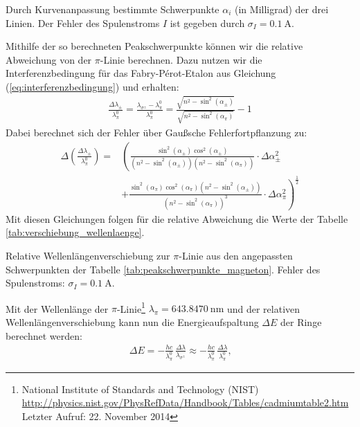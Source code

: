 \documentclass[11pt, a4paper]{article}
\begin{document}
\begin{table}[h]
	\centering
	\resizebox{\columnwidth}{!}{%
		}
	\caption{Durch Kurvenanpassung bestimmte Schwerpunkte $\alpha_i$ (in Milligrad) der drei Linien. Der Fehler des Spulenstroms $I$ ist gegeben durch $\sigma_I = \SI{0.1}{\ampere}$.}
	\label{tab:peakschwerpunkte_magneton}
\end{table}
Mithilfe der so berechneten Peakschwerpunkte können wir die relative Abweichung von der $\pi$-Linie berechnen.
Dazu nutzen wir die Interferenzbedingung für das Fabry-Pérot-Etalon aus Gleichung (\ref{eq:interferenzbedingung}) und erhalten:
\begin{align}
	\frac{\Delta \lambda_\pm}{\lambda_\pi^0} = \frac{\lambda_{\sigma^\pm} - \lambda_\pi^0}{\lambda_\pi^0} = \frac{\sqrt{n^2 - \sin^2(\alpha_{\pm})}}{\sqrt{n^2 - \sin^2(\alpha_\pi)}} - 1
\end{align}
Dabei berechnet sich der  Fehler über Gaußsche Fehlerfortpflanzung zu:
\begin{align}
	\Delta \left( \frac{\Delta \lambda_\pm}{\lambda_\pi^0} \right) = & \left( \frac{\sin^2(\alpha_\pm) \cos^2(\alpha_\pm)}{(n^2-\sin^2(\alpha_\pm))(n^2-\sin^2(\alpha_\pi))} \cdot \Delta \alpha_\pm^2 \right. \nonumber\\
	& \left. + \frac{\sin^2(\alpha_\pi) \cos^2(\alpha_\pi) (n^2 - \sin^2(\alpha_\pm))}{(n^2-\sin^2(\alpha_\pi))^3} \cdot \Delta \alpha_\pi^2\right)^\frac{1}{2}
\end{align}
Mit diesen Gleichungen folgen für die relative Abweichung die Werte der Tabelle \ref{tab:verschiebung_wellenlaenge}. 
\begin{table}[h]
	\centering
	
	\caption{Relative Wellenlängenverschiebung zur $\pi$-Linie aus den angepassten Schwerpunkten der Tabelle \ref{tab:peakschwerpunkte_magneton}. Fehler des Spulenstroms: $\sigma_I = \SI{0.1}{\ampere}$.}
	\label{tab:verschiebung_wellenlaenge}
\end{table}
Mit der Wellenlänge der $\pi$-Linie\footnote{National Institute of Standards and Technology (NIST)\\ \url{http://physics.nist.gov/PhysRefData/Handbook/Tables/cadmiumtable2.htm}\\Letzter Aufruf: 22. November 2014} $\lambda_\pi = \SI{643,8470}{\nano\metre}$  und der relativen Wellenlängenverschiebung kann nun die Energieaufspaltung $\Delta E$ der Ringe berechnet werden:
\begin{align}
	\Delta E = -\frac{h c}{\lambda_\pi^0}\,\frac{\Delta \lambda}{\lambda_{\sigma^\pm}} \approx -\frac{h c}{\lambda_\pi^0}\,\frac{\Delta \lambda}{\lambda_\pi^0} \text{,}
\end{align}
\end{document}
